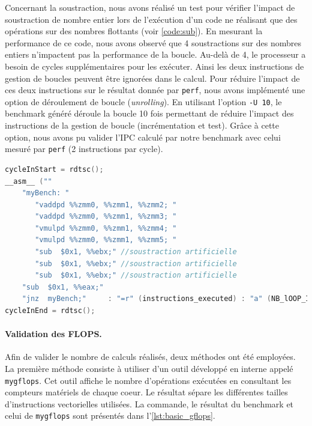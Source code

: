             Concernant la soustraction, nous avons réalisé un test pour vérifier l'impact de soustraction de nombre entier lors de l'exécution d'un code ne réalisant que des opérations sur des nombres flottants (voir \autoref{code:sub}). En mesurant la performance de ce code, nous avons observé que 4 soustractions sur des nombres entiers n'impactent pas la performance de la boucle. Au-delà de 4, le processeur a besoin de cycles supplémentaires pour les exécuter. Ainsi les deux instructions de gestion de boucles peuvent être ignorées dans le calcul. Pour réduire l'impact de ces deux instructions sur le résultat donnée par \verb|perf|, nous avons implémenté une option de déroulement de boucle (\textit{unrolling}). En utilisant l'option \verb|-U 10|, le benchmark généré déroule la boucle 10 fois permettant de réduire l'impact des instructions de la gestion de boucle (incrémentation et test). Grâce à cette option, nous avons pu valider l'IPC calculé par notre benchmark avec celui mesuré par \verb|perf| (2 instructions par cycle).
        
            \begin{minipage}{0.965\linewidth}         \begin{lstlisting}[label=code:sub ,language=C, caption={En ajoutant jusqu'à 3 soustractions, nous avons pu vérifier que la soustraction utilisée pour la gestion de la boucle n'avait aucun impact sur la performance du benchmark. En effet, la soustraction sur un nombre entier n'utilise pas la FPU.}]
cycleInStart = rdtsc();
__asm__ ("" 
    "myBench: " 
       "vaddpd %%zmm0, %%zmm1, %%zmm2; "
       "vaddpd %%zmm0, %%zmm1, %%zmm3; "
       "vmulpd %%zmm0, %%zmm1, %%zmm4; "
       "vmulpd %%zmm0, %%zmm1, %%zmm5; "
       "sub  $0x1, %%ebx;" //soustraction artificielle
       "sub  $0x1, %%ebx;" //soustraction artificielle
       "sub  $0x1, %%ebx;" //soustraction artificielle
    "sub  $0x1, %%eax;"
    "jnz  myBench;"		: "=r" (instructions_executed) : "a" (NB_lOOP_IN));
cycleInEnd = rdtsc();
\end{lstlisting} \end{minipage}
        
        
        \paragraph{Validation des FLOPS.} 
            Afin de valider le nombre de calculs réalisés, deux méthodes ont été employées.
            La première méthode consiste à utiliser d'un outil développé en interne appelé \verb=mygflops=. Cet outil affiche le nombre d'opérations exécutées en consultant les compteurs matériels de chaque coeur. Le résultat sépare les différentes tailles d'instructions vectorielles utilisées. La commande, le résultat du benchmark et celui de \verb=mygflops= sont présentés dans l'\autoref{lst:basic_gflops}. 
        

